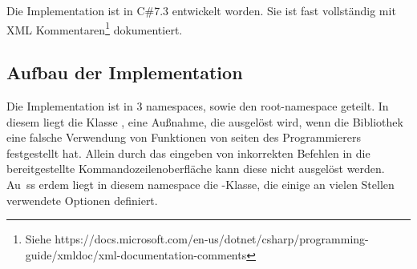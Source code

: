  Die Implementation ist in C\#7.3 entwickelt worden.
 Sie ist fast vollständig mit XML Kommentaren\footnote{Siehe https://docs.microsoft.com/en-us/dotnet/csharp/programming-guide/xmldoc/xml-documentation-comments} dokumentiert.
 \subsection{Aufbau der Implementation}\label{subsec:Architecture}
 Die Implementation ist in 3 namespaces, sowie den root-namespace geteilt.
 In diesem liegt die Klasse , eine Au\ss nahme, die ausgelöst wird, wenn die Bibliothek eine falsche Verwendung von Funktionen von seiten des Programmierers festgestellt hat.
 Allein durch das eingeben von inkorrekten Befehlen in die bereitgestellte Kommandozeilenoberfläche kann diese nicht ausgelöst werden. Au\
 ss erdem liegt in diesem namespace die -Klasse, die einige an vielen Stellen verwendete Optionen definiert.
